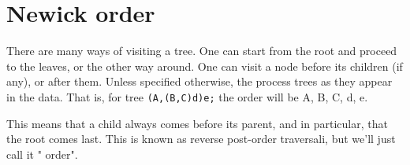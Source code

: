 \chapter{Newick order}
\label{newick_order}

There are many ways of visiting a tree. One can start from the root and
proceed to the leaves, or the other way around. One can visit a node before
its children (if any), or after them. Unless specified otherwise, the
\nutils{} process trees as they appear in the \nw{} data. That is, for
tree \texttt{(A,(B,C)d)e;} the order will be A, B, C, d, e.

This means that a child always comes before its parent, and in particular,
that the root comes last. This is known as reverse post-order traversali, but
we'll just call it "\nw{} order".
